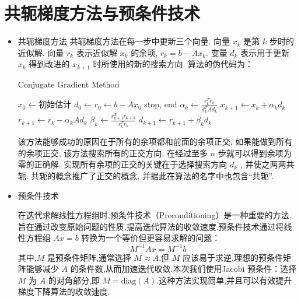 \documentclass[a4paper]{article}
\numberwithin{equation}{section}
\begin{document}
\section{共轭梯度方法与预条件技术}
\begin{itemize}
    \item 共轭梯度方法
          共轭梯度方法在每一步中更新三个向量. 向量  $x_{k}$  是第  $k$  步时的近似解. 向量  $r_{k}$  表示近似解  $x_{k}$  的余项, $r_{k}=b-A x_{k}$. 变量  $d_{k}$  表示用于更新  $x_{k}$  得到改进的  $x_{k+1}$  时所使用的新的搜索方向. 算法的伪代码为：
          \begin{algorithm}
              \caption{Conjugate Gradient Method}
              \begin{algorithmic}[1]
                  \STATE $x_0 \gets \text{初始估计}$
                  \STATE $d_0 \gets r_0 \gets b - A x_0$
                  \STATE stop, end
                  \ENDIF
                  \STATE $\alpha_k \gets \frac{r_k^T r_k}{d_k^T A d_k}$
                  \STATE $x_{k+1} \gets x_k + \alpha_k d_k$
                  \STATE $r_{k+1} \gets r_k - \alpha_k A d_k$
                  \STATE $\beta_k \gets \frac{r_{k+1}^T r_{k+1}}{r_k^T r_k}$
                  \STATE $d_{k+1} \gets r_{k+1} + \beta_k d_k$
                  \ENDFOR
              \end{algorithmic}
          \end{algorithm}

          该方法能够成功的原因在于所有的余项都和前面的余项正交. 如果能做到所有的余项正交, 该方法搜索所有的正交方向, 在经过至多  $n$  步就可以得到余项为零的正确解. 实现所有余项的正交的关键在于选择搜索方向  $d_{k}$ , 并使之两两共轭. 共轭的概念推广了正交的概念, 并据此在算法的名字中也包含“共轭”.
    \item  预条件技术

          在迭代求解线性方程组时,预条件技术（Preconditioning）是一种重要的方法,旨在通过改变原始问题的性质,提高迭代算法的收敛速度.预条件技术通过将线性方程组 \( Ax = b \) 转换为一个等价但更容易求解的问题：
          \begin{equation}
              M^{-1} A x = M^{-1} b
          \end{equation}
          其中,\( M \) 是预条件矩阵,通常选择 \( M \approx A \),但 \( M \) 应该易于求逆.理想的预条件矩阵能够减少 \( A \) 的条件数,从而加速迭代收敛.本次我们使用Jacobi 预条件：选择 \( M \) 为 \( A \) 的对角部分,即 \( M = \text{diag}(A) \).这种方法实现简单,并且可以有效提升梯度下降算法的收敛速度.
\end{itemize}
\end{document}
